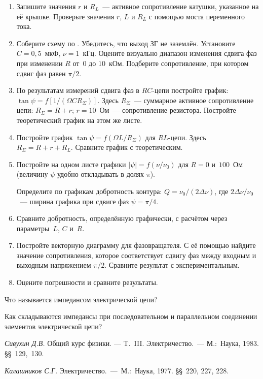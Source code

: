 \begin{lab:task}
\begin{enumerate}
	\item Запишите значения $r$ и $R_L$~--- активное сопротивление катушки, указанное на её крышке. Проверьте значения $r$, $L$ и $R_L$ с
	помощью моста переменного тока.
	
	
	\item Соберите схему по . Убедитесь, что выход ЗГ не заземлён. Установите $C=0,5$~мкФ, $\nu=1$~кГц. Оцените визуально
	диапазон изменения сдвига фаз при изменении $R$ от~$0$ до $10$~кОм. Подберите сопротивление, при котором сдвиг фаз равен $\pi/2$. 
	
	
	\item По результатам измерений сдвига фаз в $RC$-цепи постройте график: $\tan\psi=f[1/(\Omega C R_{\Sigma})]$. Здесь
	$R_{\Sigma}$~--- суммарное активное сопротивление цепи: $R_{\Sigma}=R+r$; $r=10$~Ом~--- сопротивление резистора.
	Постройте теоретический график на этом же листе.
	
	\item Постройте график $\tan\psi=f(\Omega L/R_{\Sigma})$ для $RL$-цепи. Здесь $R_{\Sigma}=R+r+R_L$. Сравните график с
	теоретическим.
	
	\item Постройте на одном листе графики $|\psi|=f(\nu/\nu_0)$ для $R=0$ и~$100$~Ом (величину $\psi$ удобно откладывать в
	долях $\pi$).
	
	Определите по графикам добротность контура: $Q=\nu_0/(2\Delta\nu)$, где $2\Delta\nu/\nu_0$~--- ширина графика при сдвиге
	фаз $\psi=\pi/4$.
	
	\item Сравните добротность, определённую графически, с расчётом через параметры~$L$, $C$ и~$R$.
	
	\item Постройте векторную диаграмму для фазовращателя. С её помощью найдите значение сопротивления, которое соответствует сдвигу фаз между входным и выходным напряжением $\pi/2$. Сравните результат с экспериментальным.
	
	\item Оцените погрешности и сравните результаты.
	\end{enumerate}


\end{lab:task}


\begin{lab:questions}
	\item Что называется импедансом электрической цепи?
	\item Как складываются импедансы при последовательном и параллельном соединении элементов электрической цепи?
\end{lab:questions}


\begin{lab:literature}
	\item \emph {Сивухин Д.В.} Общий курс физики. --- T.~III. Электричество.~--- М.:~Наука, 1983. \S\S~129,~130.
	\item \emph {Калашников С.Г.} Электричество.~---~М.:~Наука, 1977. \S\S~220, 227, 228.
\end{lab:literature}
